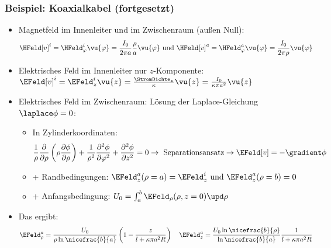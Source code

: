 \begin{frame}
  \frametitle{Beispiel: Koaxialkabel (fortgesetzt)}
\begin{itemize}[<+->]
\item Magnetfeld im Innenleiter und im Zwischenraum (außen Null):
  $$
  \HFeld[v]^i = \HFeld_\varphi^i \vu{\varphi} = \frac{I_0}{2\pi a}\frac{\rho}{a} \vu{\varphi} \text{ und } \HFeld[v]^a = \HFeld_\varphi^a \vu{\varphi} = \frac{I_0}{2\pi \rho} \vu{\varphi}
  $$
\item Elektrisches Feld im Innenleiter nur $z$-Komponente: $\EFeld[v]^i=\EFeld_z^i \vu{z} = \frac{\StromDichte_z}{\kappa}\vu{z}=\frac{I_0}{\kappa\pi a^2}\vu{z}$
\item Elektrisches Feld im Zwischenraum: Lösung der Laplace-Gleichung $\laplace \phi =0$:
  \begin{itemize}[<+->]
  \item In Zylinderkoordinaten:
    $$
    \frac{1}{\rho}\frac{\partial}{\partial \rho}\left(\rho\frac{\partial \phi}{\partial \rho}\right) + \frac{1}{\rho^2}\frac{\partial^2 \phi}{\partial \varphi^2} + \frac{\partial^2 \phi}{\partial z^2} =0 \to \text{ Separationsansatz} \to \EFeld[v] = -\gradient\phi
    $$
  \item + Randbedingungen: $\EFeld_z^a(\rho=a) = \EFeld_z^i \text{ und } \EFeld_z^a(\rho=b) = 0$
    \item + Anfangsbedingung: $U_0=\int_a^b \EFeld_\rho(\rho, z=0)\upd\rho$
    \end{itemize}
  \item Das ergibt:
    $$
    \EFeld_\rho^a = \frac{U_0}{\rho \ln\nicefrac{b}{a}}\left(1-\frac{z}{l+\kappa\pi a^2 R}\right) \quad \EFeld_z^a = \frac{U_0 \ln\nicefrac{b}{\rho}}{\ln\nicefrac{b}{a}}\frac{1}{l+\kappa\pi a^2 R} 
    $$
  \end{itemize}
\end{frame}

